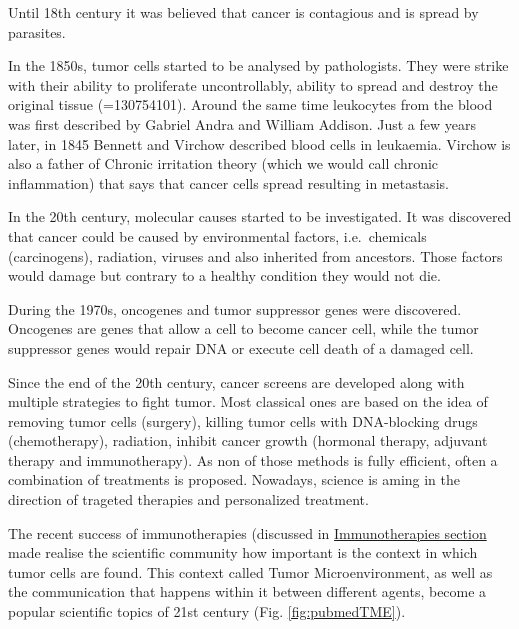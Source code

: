 \documentclass[12pt,]{book}
\theoremstyle{definition}
\theoremstyle{definition}
\theoremstyle{definition}
\theoremstyle{remark}
\begin{document}
Until 18th century it was believed that cancer is contagious and is
spread by parasites.

In the 1850s, tumor cells started to be analysed by pathologists. They
were strike with their ability to proliferate uncontrollably, ability to
spread and destroy the original tissue
(\citet{https://www.npr.org/templates/story/story.php?storyId}=130754101).
Around the same time leukocytes from the blood was first described by
Gabriel Andra and William Addison. Just a few years later, in 1845
Bennett and Virchow described blood cells in leukaemia. Virchow is also
a father of Chronic irritation theory (which we would call chronic
inflammation) that says that cancer cells spread resulting in
metastasis.

In the 20th century, molecular causes started to be investigated. It was
discovered that cancer could be caused by environmental factors,
i.e.~chemicals (carcinogens), radiation, viruses and also inherited from
ancestors. Those factors would damage but contrary to a healthy
condition they would not die.

During the 1970s, oncogenes and tumor suppressor genes were discovered.
Oncogenes are genes that allow a cell to become cancer cell, while the
tumor suppressor genes would repair DNA or execute cell death of a
damaged cell.

Since the end of the 20th century, cancer screens are developed along
with multiple strategies to fight tumor. Most classical ones are based
on the idea of removing tumor cells (surgery), killing tumor cells with
DNA-blocking drugs (chemotherapy), radiation, inhibit cancer growth
(hormonal therapy, adjuvant therapy and immunotherapy). As non of those
methods is fully efficient, often a combination of treatments is
proposed. Nowadays, science is aming in the direction of trageted
therapies and personalized treatment.

The recent success of immunotherapies (discussed in
\protect\hyperlink{immunotherapies}{Immunotherapies section} made
realise the scientific community how important is the context in which
tumor cells are found. This context called Tumor Microenvironment, as
well as the communication that happens within it between different
agents, become a popular scientific topics of 21st century (Fig.
\ref{fig:pubmedTME}).
\end{document}
